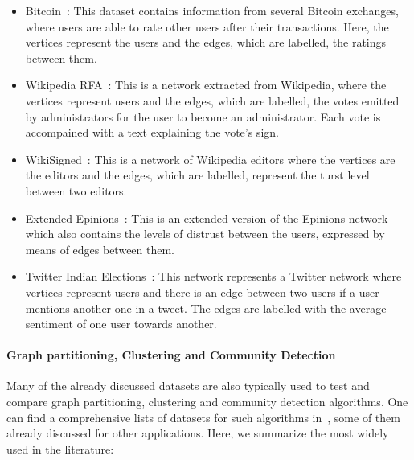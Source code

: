   \begin{itemize}
    \item Bitcoin~\cite{moore2013beware}: This dataset contains information from
      several Bitcoin exchanges, where users are able to rate other users after
      their transactions. Here, the vertices represent the users and the edges,
      which are labelled, the ratings between them.
    \item Wikipedia RFA~\cite{west2014exploiting}: This is a network extracted
      from Wikipedia, where the vertices represent users  and the
      edges, which are labelled, the votes emitted by administrators for the
      user to become an administrator.  Each vote is accompained with a text
      explaining the vote's sign. 
    \item WikiSigned~\cite{maniu2011building}: This is a network of Wikipedia
      editors where the vertices are the editors and the edges, which are
      labelled, represent the turst level between two editors.
    \item Extended Epinions~\cite{massa2007trust}: This is an extended version of
      the Epinions network which also contains the levels of distrust between the
      users, expressed by means of edges between them.
    \item Twitter Indian Elections~\cite{kagan2015using}: This network represents
      a Twitter network where vertices represent users and there is an edge
      between two users if a user mentions another one in a tweet. The edges
      are labelled with the average sentiment of one user towards another. 
  \end{itemize}


\paragraph{Graph partitioning, Clustering and Community Detection}

Many of the already discussed datasets are also typically used to test and
compare graph partitioning, clustering and community detection algorithms. One
can find a comprehensive lists of datasets for such algorithms
in~\cite{10dimacs,yang2015defining}, some of them already discussed for other
applications. Here, we summarize the most widely used in the literature:

